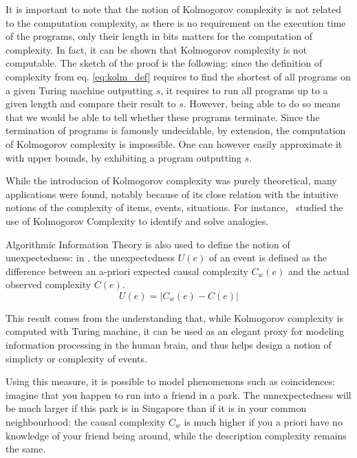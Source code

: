 \documentclass[conference]{IEEEtran}
\begin{document}
It is important to note that the notion of Kolmogorov complexity is not related
to the computation complexity, as there is no requirement on the execution time
of the programs, only their length in bits matters for the computation of
complexity. In fact, it can be shown that Kolmogorov complexity is not
computable\cite{li_introduction_2008}. The sketch of the proof is the following:
since the definition of complexity from eq. \ref{eq:kolm_def} requires to find
the shortest of all programs on a given Turing machine outputting $s$, it
requires to run all programs up to a given length and compare their result to
$s$. However, being able to do so means that we would be able to tell whether
these programs terminate. Since the termination of programs is famously
undecidable, by extension, the computation of Kolmogorov complexity is
impossible. One can however easily approximate it with upper bounds, by
exhibiting a program outputting $s$.

While the introducion of Kolmogorov complexity was purely theoretical, many
applications were found, notably because of its close relation with the
intuitive notions of the complexity of items, events, situations. For
instance,~\cite{murena_solving_2020} studied the use of Kolmogorov Complexity to
identify and solve analogies.

Algorithmic Information Theory is also used to define the notion of
unexpectedness: in \cite{dessalles2011coincidences}, the unexpectedness $U(e)$
of an event is defined as the difference between an a-priori expected causal
complexity $C_{w}(e)$ and the actual observed complexity $C(e)$.
\begin{equation}
  \label{eq:unexpected}
  U(e) = |C_{w}(e) - C(e)|
\end{equation}

This result comes from the understanding that, while Kolmogorov complexity is
computed with Turing machine, it can be used as an elegant proxy for modeling
information processing in the human brain, and thus helps design a notion of
simplicty or complexity of events\cite{}.

Using this measure, it is possible to model phenomenons such as coincidences:
imagine that you happen to run into a friend in a park. The unnexpectedness will
be much larger if this park is in Singapore than if it is in your common
neighbourhood: the causal complexity $C_{w}$ is much higher if you a priori have
no knowledge of your friend being around, while the description complexity
remains the same.
\end{document}
